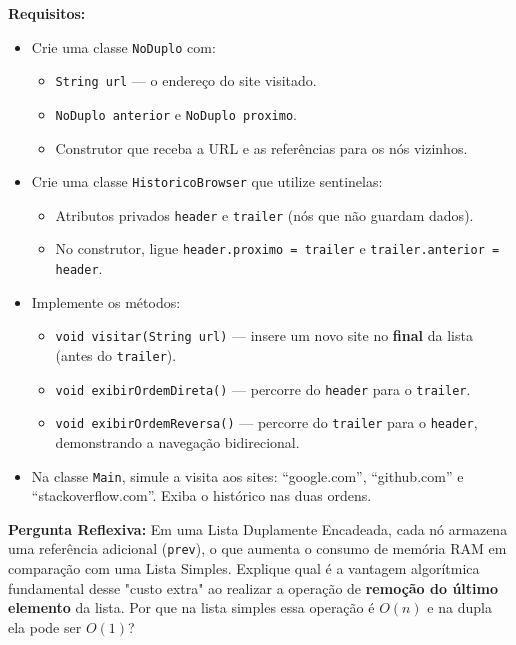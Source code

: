 \documentclass[12pt, a4paper]{article}
\begin{document}
\textbf{Requisitos:}
\begin{itemize}
    \item Crie uma classe \texttt{NoDuplo} com:
    \begin{itemize}
        \item \texttt{String url} — o endereço do site visitado.
        \item \texttt{NoDuplo anterior} e \texttt{NoDuplo proximo}.
        \item Construtor que receba a URL e as referências para os nós vizinhos.
    \end{itemize}
    \item Crie uma classe \texttt{HistoricoBrowser} que utilize sentinelas:
    \begin{itemize}
        \item Atributos privados \texttt{header} e \texttt{trailer} (nós que não guardam dados).
        \item No construtor, ligue \texttt{header.proximo = trailer} e \texttt{trailer.anterior = header}.
    \end{itemize}
    \item Implemente os métodos:
    \begin{itemize}
        \item \texttt{void visitar(String url)} — insere um novo site no \textbf{final} da lista (antes do \texttt{trailer}).
        \item \texttt{void exibirOrdemDireta()} — percorre do \texttt{header} para o \texttt{trailer}.
        \item \texttt{void exibirOrdemReversa()} — percorre do \texttt{trailer} para o \texttt{header}, demonstrando a navegação bidirecional.
    \end{itemize}
    \item Na classe \texttt{Main}, simule a visita aos sites: ``google.com'', ``github.com'' e ``stackoverflow.com''. Exiba o histórico nas duas ordens.
\end{itemize}

\textbf{Pergunta Reflexiva:} Em uma Lista Duplamente Encadeada, cada nó armazena uma referência adicional (\texttt{prev}), o que aumenta o consumo de memória RAM em comparação com uma Lista Simples. Explique qual é a vantagem algorítmica fundamental desse "custo extra" ao realizar a operação de \textbf{remoção do último elemento} da lista. Por que na lista simples essa operação é $O(n)$ e na dupla ela pode ser $O(1)$?

\vspace{0.2cm}
\end{document}
